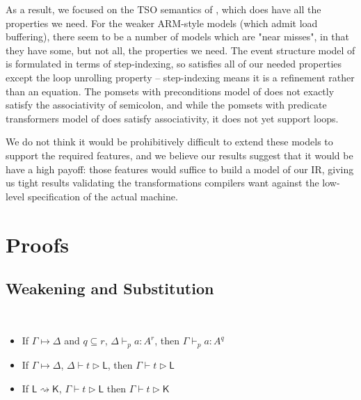 \documentclass[acmsmall,screen,review]{acmart}
\newcommand{\ms}[1]{\ensuremath{\mathsf{#1}}}
\newcommand{\cwk}[2]{#1 \mapsto #2}
\newcommand{\lwk}[2]{#1 \rightsquigarrow #2}
\newcommand{\hasty}[5]{#1 \vdash_{#2} #3: {#4}^{#5}}
\newcommand{\haslb}[3]{#1 \vdash #2 \rhd #3}
\begin{document}
As a result, we focused on the TSO semantics of \citet{sparky}, which
does have all the properties we need. For the weaker ARM-style models
(which admit load buffering), there seem to be a number of models
which are "near misses", in that they have some, but not all, the
properties we need. The event structure model of
\citet{paviotti-modular-relaxed-dep-20} is formulated in terms of
step-indexing, so satisfies all of our needed properties except the
loop unrolling property -- step-indexing means it is a refinement
rather than an equation. The pomsets with preconditions model of
\citet{jagadeesan-pwp-20} does not exactly satisfy the associativity
of semicolon, and while the pomsets with predicate transformers model
of \citet{leaky-semicolon} does satisfy associativity, it does not yet
support loops.

We do not think it would be prohibitively difficult to extend these
models to support the required features, and we believe our results
suggest that it would be have a high payoff: those features would
suffice to build a model of our IR, giving us tight results
validating the transformations compilers want against the low-level
specification of the actual machine. 




\clearpage 

\appendix

\section{Proofs}

\subsection{Weakening and Substitution}

\begin{theorem}[Weakening] \
  \begin{itemize}
    \item If \(\cwk{\Gamma}{\Delta}\) and \(q \subseteq r\),
    \(\hasty{\Delta}{p}{a}{A}{r}\), then \(\hasty{\Gamma}{p}{a}{A}{q}\)
    \item If \(\cwk{\Gamma}{\Delta}\), \(\haslb{\Delta}{t}{\ms{L}}\), then
    \(\haslb{\Gamma}{t}{\ms{L}}\)
    \item If \(\lwk{\ms{L}}{\ms{K}}\), \(\haslb{\Gamma}{t}{\ms{L}}\) then
    \(\haslb{\Gamma}{t}{\ms{K}}\)
  \end{itemize}
\end{theorem}
\end{document}
